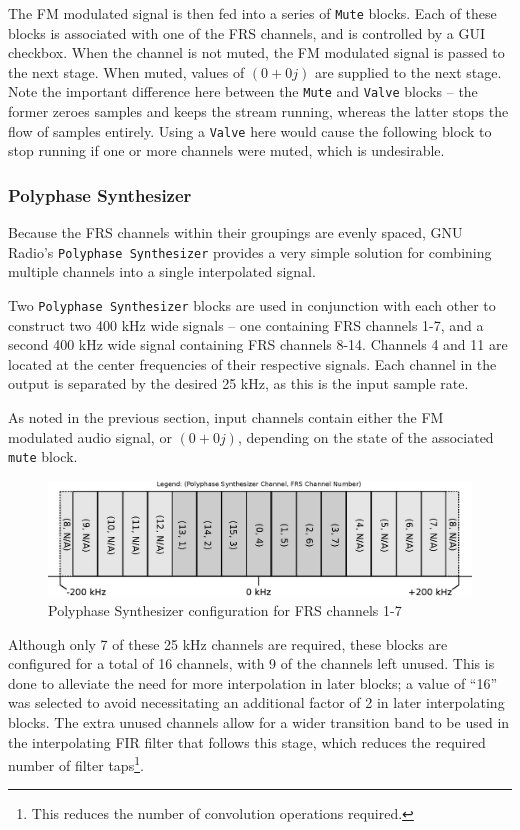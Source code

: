 The FM modulated signal is then fed into a series of \texttt{Mute} blocks. Each
of these blocks is associated with one of the \ac{FRS} channels, and is
controlled by a \ac{GUI} checkbox. When the channel is not muted, the FM modulated
signal is passed to the next stage. When muted, values of $(0 + 0j)$ are
supplied to the next stage. Note the important difference here between the
\texttt{Mute} and \texttt{Valve} blocks -- the former zeroes samples and keeps
the stream running, whereas the latter stops the flow of samples entirely.
Using a \texttt{Valve} here would cause the following block to stop running if
one or more channels were muted, which is undesirable.

\subsubsection{Polyphase Synthesizer} \label{sec:polysynth}
Because the \ac{FRS} channels within their groupings are evenly spaced,
GNU Radio's \texttt{Polyphase Synthesizer} \cite{TRONDEAU_PFB} provides a very
simple solution for combining multiple channels into a single interpolated signal.

Two \texttt{Polyphase Synthesizer} blocks are used in conjunction with each other to
construct two 400 kHz wide signals -- one containing \ac{FRS} channels 1-7, and a second
400 kHz wide signal containing \ac{FRS} channels 8-14. Channels 4 and 11 are
located at the center frequencies of their respective signals. Each channel in
the output is separated by the desired 25 kHz, as this is the input sample rate.

As noted in the previous section, input channels contain either the FM
modulated audio signal, or $(0 + 0j)$, depending on the state of the associated
\texttt{mute} block.

\begin{figure}[h!]
  \centering
  \includegraphics[scale=0.85]{images/frs/polyphase_synth_ch1-7.eps}
  \caption{Polyphase Synthesizer configuration for FRS channels 1-7}
  \label{fig:polyphasesynth}
\end{figure}

Although only 7 of these 25 kHz channels are required, these blocks are
configured for a total of 16 channels, with 9 of the channels left unused. This
is done to alleviate the need for more interpolation in later blocks; a
value of ``16'' was selected to avoid necessitating an additional factor of 2
in later interpolating blocks.  The extra unused channels
allow for a wider transition band to be used in the interpolating \ac{FIR}
filter that follows this stage, which reduces the required number of filter
taps\footnote{This reduces the number of convolution operations required.}.

